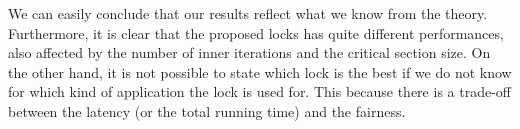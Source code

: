 We can easily conclude that our results reflect what we know from the theory. Furthermore, it is clear that the proposed locks has quite different performances, also affected by the number of inner iterations and the critical section size. On the other hand, it is not possible to state which lock is the best if we do not know for which kind of application the lock is used for. This because there is a trade-off between the latency (or the total running time) and the fairness.
